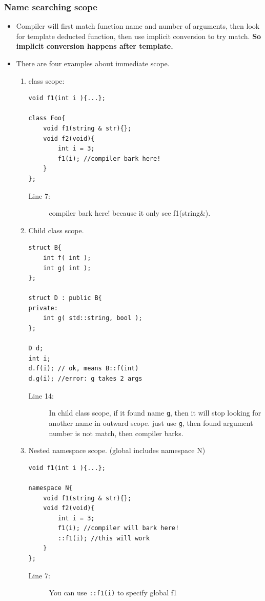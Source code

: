 \documentclass[a4paper,11pt,twoside]{book}
\begin{document}
\subsubsection{Name searching scope}
\begin{itemize}
	
	\item Compiler will first match function name and number of arguments, then look for template deducted function, then use implicit conversion to try match. \textbf{So implicit conversion happens after template.}
	
	\item There are four examples about immediate scope.
	\begin{enumerate}
		\item class scope:
\begin{lstlisting}
void f1(int i ){...};

class Foo{
	void f1(string & str){};
	void f2(void){
		int i = 3;
		f1(i); //compiler bark here!
	}
};
\end{lstlisting}
\begin{description}
	\item[Line 7:] compiler bark here! because it only see f1(string\&).
\end{description}
		
		\item Child class scope. 
\begin{lstlisting}
struct B{
	int f( int );
	int g( int );
};
		
struct D : public B{
private:
	int g( std::string, bool );
};
		
D d;
int i;
d.f(i); // ok, means B::f(int)
d.g(i); //error: g takes 2 args
\end{lstlisting}
\begin{description}
	\item[Line 14:] In child class scope, if it found name \texttt{g}, then it will stop looking for another name in outward scope. just use \texttt{g}, then found argument number is not match, then compiler barks.
\end{description}
		
\item Nested namespace scope. (global includes namespace N)
\begin{lstlisting}
void f1(int i ){...};

namespace N{
	void f1(string & str){};
	void f2(void){
		int i = 3;
		f1(i); //compiler will bark here!
		::f1(i); //this will work
	}
};
\end{lstlisting}
\begin{description}
	\item[Line 7:] You can use \texttt{::f1(i)} to specify global f1
\end{description}


\end{enumerate}
\end{itemize}
\end{document}
